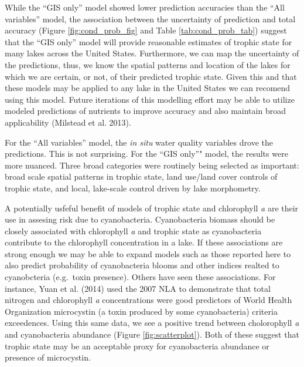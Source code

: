 \documentclass[11pt,]{article}
\begin{document}
While the ``GIS only'' model showed lower prediction accuracies than the
``All variables'' model, the association between the uncertainty of
prediction and total accuracy (Figure \ref{fig:cond_prob_fig} and Table
\ref{tab:cond_prob_tab}) suggest that the ``GIS only'' model will
provide reasonable estimates of trophic state for many lakes across the
United States. Furthermore, we can map the uncertainty of the
predictions, thus, we know the spatial patterns and location of the
lakes for which we are certain, or not, of their predicted trophic
state. Given this and that these models may be applied to any lake in
the United States we can recomend using this model. Future iterations of
this modelling effort may be able to utilize modeled predictions of
nutrients to improve accuracy and also maintain broad applicability
(Milstead et al. 2013).

For the ``All variables'' model, the \emph{in situ} water quality
variables drove the predictions. This is not surprising. For the ``GIS
only''" model, the results were more nuanced. Three broad categories
were routinely being selected as important: broad scale spatial patterns
in trophic state, land use/land cover controls of trophic state, and
local, lake-scale control driven by lake morphometry.

A potentially usfeful benefit of models of trophic state and chlorophyll
\emph{a} are their use in assesing risk due to cyanobacteria.
Cyanobacteria biomass should be closely associated with chlorophyll
\emph{a} and trophic state as cyanobacteria contribute to the
chlorophyll concentration in a lake. If these associations are strong
enough we may be able to expand models such as those reported here to
also predict probability of cyanobacteria blooms and other indices
realted to cyanobcteria (e.g.~toxin presence). Others have seen these
associations. For instance, Yuan et al. (2014) used the 2007 NLA to
demonstrate that total nitrogen and chlorophyll \emph{a} concentrations
were good predictors of World Health Organization microcystin (a toxin
produced by some cyanobacteria) criteria exceedences. Using this same
data, we see a positive trend between cholorophyll \emph{a} and
cyanobacteria abundance (Figure \ref{fig:scatterplot}). Both of these
suggest that trophic state may be an acceptable proxy for cyanobacteria
abundance or presence of microcystin.
\end{document}
